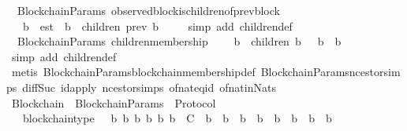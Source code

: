 \begin{isabellebody}
\isanewline
{}\isamarkupfalse%
\ {\isacharparenleft}\ BlockchainParams{\isacharparenright}\ observed{\isacharunderscore}block{\isacharunderscore}is{\isacharunderscore}children{\isacharunderscore}of{\isacharunderscore}prev{\isacharunderscore}block\ {\isacharcolon}\isanewline
\ \ {\isachardoublequoteopen}{\isasymforall}\ b\ {\isasymin}\ est\ {\isacharbackquote}{\isasymsigma}{\isachardot}\ b\ {\isasymin}\ children\ {\isacharparenleft}prev\ b{\isacharcomma}\ {\isasymsigma}{\isacharparenright}{\isachardoublequoteclose}\isanewline
%
\isadelimproof
\ \ %
\endisadelimproof
%
\isatagproof
{}\isamarkupfalse%
\ {\isacharparenleft}simp\ add{\isacharcolon}\ children{\isacharunderscore}def{\isacharparenright}%
\endisatagproof
{\isafoldproof}%
%
\isadelimproof
\ \ \isanewline
%
\endisadelimproof
\isanewline
{}\isamarkupfalse%
\ {\isacharparenleft}\ BlockchainParams{\isacharparenright}\ children{\isacharunderscore}membership\ {\isacharcolon}\isanewline
\ \ {\isachardoublequoteopen}{\isasymforall}\ b\ {\isasymin}\ children\ {\isacharparenleft}b{\isacharprime}{\isacharcomma}\ {\isasymsigma}{\isacharparenright}{\isachardot}\ \ b{\isacharprime}\ {\isasymdownharpoonright}\ b{\isachardoublequoteclose}\isanewline
%
\isadelimproof
\ \ %
\endisadelimproof
%
\isatagproof
{}\isamarkupfalse%
\ {\isacharparenleft}simp\ add{\isacharcolon}\ children{\isacharunderscore}def{\isacharparenright}\ \isanewline
\ \ \isamarkupfalse%
\ {\isacharparenleft}metis\ BlockchainParams{\isachardot}blockchain{\isacharunderscore}membership{\isacharunderscore}def\ BlockchainParams{\isachardot}n{\isacharunderscore}cestor{\isachardot}simps{\isacharparenleft}{}{\isacharparenright}\ diff{\isacharunderscore}Suc{\isacharunderscore}{}\ id{\isacharunderscore}apply\ n{\isacharunderscore}cestor{\isachardot}simps{\isacharparenleft}{}{\isacharparenright}\ of{\isacharunderscore}nat{\isacharunderscore}eq{\isacharunderscore}id\ of{\isacharunderscore}nat{\isacharunderscore}in{\isacharunderscore}Nats{\isacharparenright}%
\endisatagproof
{\isafoldproof}%
%
\isadelimproof
\isanewline
%
\endisadelimproof
\isanewline
\isanewline
\isanewline
\isanewline
\isanewline
\isanewline
{}\isamarkupfalse%
\ Blockchain\ {\isacharequal}\ BlockchainParams\ {\isacharplus}\ Protocol\ {\isacharplus}\isanewline
\ \ \isanewline
\ \ \ blockchain{\isacharunderscore}type\ {\isacharcolon}\ {\isachardoublequoteopen}{\isasymforall}\ b\ b{\isacharprime}\ b{\isacharprime}{\isacharprime}{\isachardot}\ {\isacharbraceleft}b{\isacharcomma}\ b{\isacharprime}{\isacharcomma}\ b{\isacharprime}{\isacharprime}{\isacharbraceright}\ {\isasymsubseteq}\ C\ {\isasymlongrightarrow}\ b{\isacharprime}\ {\isasymdownharpoonright}\ b\ {\isasymand}\ b{\isacharprime}{\isacharprime}\ {\isasymdownharpoonright}\ b\ {\isasymlongrightarrow}\ {\isacharparenleft}b{\isacharprime}\ {\isasymdownharpoonright}\ b{\isacharprime}{\isacharprime}\ {\isasymor}\ b{\isacharprime}{\isacharprime}\ {\isasymdownharpoonright}\ b{\isacharprime}{\isacharparenright}{\isachardoublequoteclose}\isanewline

\end{isabellebody}
